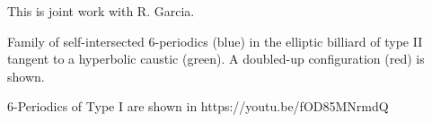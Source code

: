 This is joint work with R. Garcia.

Family of self-intersected 6-periodics (blue) in the elliptic billiard of type II tangent to a hyperbolic caustic (green). A doubled-up configuration (red) is shown.

6-Periodics of Type I are shown in https://youtu.be/fOD85MNrmdQ